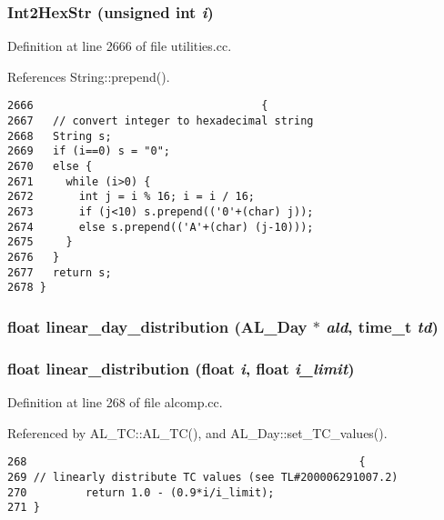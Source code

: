 \subsubsection{ Int2Hex\-Str (unsigned int {\em i})}\label{dil2al_8hh_a279}




Definition at line 2666 of file utilities.cc.

References String::prepend().



\footnotesize\begin{verbatim}2666                                   {
2667   // convert integer to hexadecimal string
2668   String s;
2669   if (i==0) s = "0";
2670   else {
2671     while (i>0) {
2672       int j = i % 16; i = i / 16;
2673       if (j<10) s.prepend(('0'+(char) j));
2674       else s.prepend(('A'+(char) (j-10)));
2675     }
2676   }
2677   return s;
2678 }
\end{verbatim}\normalsize 
{}
\subsubsection{\setlength{\rightskip}{0pt plus 5cm}float linear\_\-day\_\-distribution ({\bf AL\_\-Day} $\ast$ {\em ald}, time\_\-t {\em td})}\label{dil2al_8hh_a291}


\subsubsection{\setlength{\rightskip}{0pt plus 5cm}float linear\_\-distribution (float {\em i}, float {\em i\_\-limit})}\label{dil2al_8hh_a288}




Definition at line 268 of file alcomp.cc.

Referenced by AL\_\-TC::AL\_\-TC(), and AL\_\-Day::set\_\-TC\_\-values().



\footnotesize\begin{verbatim}268                                                   {
269 // linearly distribute TC values (see TL#200006291007.2)
270         return 1.0 - (0.9*i/i_limit);
271 }
\end{verbatim}\normalsize 
{}
